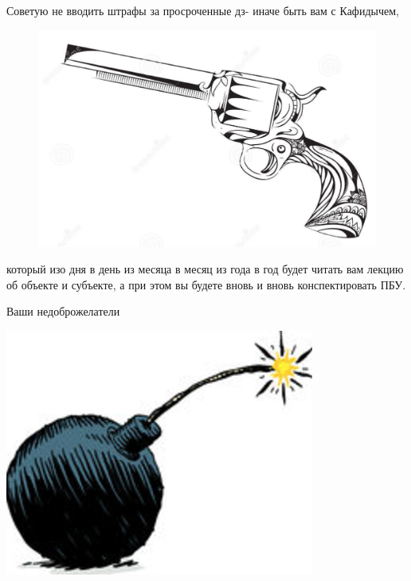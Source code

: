 \documentclass[12pt, a4paper]{article}
\begin{document}
Советую не вводить штрафы \newline за просроченные дз- иначе быть вам  с Кафидычем,
\begin{figure} 
\includegraphics[width=\linewidth]{rev1.png}
\end{figure}
 который изо дня в день из месяца в месяц из года в год будет читать вам лекцию об объекте и субъекте, а при этом вы будете вновь и вновь конспектировать ПБУ. 
\begin{flushright}
Ваши недоброжелатели
\end{flushright}
\includegraphics[scale=0.5]{bmb.png}
\end{document}
